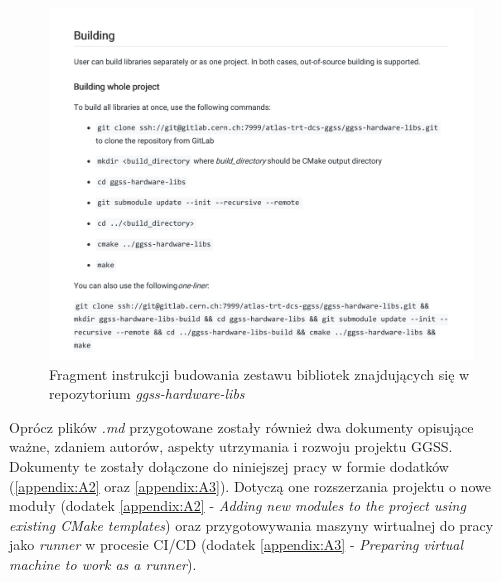 \begin{figure}
\centering
\caption{Fragment instrukcji budowania zestawu bibliotek znajdujących się w repozytorium \textit{ggss-hardware-libs}}
\label{fig:markdownHardware}
\includegraphics[width=\textwidth]{res/HardwareLibs}
\end{figure}

Oprócz plików \textit{.md} przygotowane zostały również dwa dokumenty opisujące ważne, zdaniem autorów, aspekty utrzymania i rozwoju projektu GGSS. Dokumenty te zostały dołączone do niniejszej pracy w formie dodatków (\ref{appendix:A2} oraz \ref{appendix:A3}). Dotyczą one rozszerzania projektu o nowe moduły (dodatek \ref{appendix:A2} - \textit{Adding new modules to the project using existing CMake
templates}) oraz przygotowywania maszyny wirtualnej do pracy jako \textit{runner} w procesie CI/CD (dodatek \ref{appendix:A3} - \textit{Preparing virtual machine to work as a runner}). 
